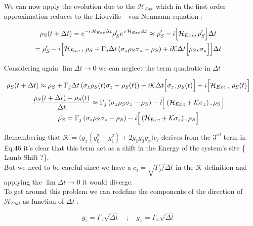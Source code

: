 \documentclass[a4paper,12pt]{article}
\begin{document}
	   We can now apply the evolution due to the $ \mathcal{H}_{Exc} $ which in the first order approximation reduces to the Liouville - von Neumann equation : 
	   
	   \begin{gather}
	   	\rho_S (t + \Delta t) = e^{-i \, \mathcal{H}_{Exc} \Delta t} \rho_S' e^{\, i \, \mathcal{H}_{Exc} \Delta t} \approx \rho_S' - i \Big[\mathcal{H}_{Exc} , \rho_S' \Big] \Delta t \notag \\
	   	= \rho_S' - i \Big[ \mathcal{H}_{Exc} \, , \, \rho_S + \Gamma_{j} \Delta t \left( \sigma_{z} \rho_S \sigma_{z} - \rho_S \right) + i \mathcal{K} \Delta t \Big[ \rho_S , \sigma_{z} \Big] \Big] \Delta t
	   \end{gather} 
	   
	   Considering again $ \lim \Delta t \rightarrow 0 $ we can neglect the term quadratic in $ \Delta t $
	   
	   \begin{gather}
	   	\rho_S (t + \Delta t) \approx \rho_S + \Gamma_{j} \Delta t \left( \sigma_{z} \rho_S (t) \sigma_{z} - \rho_S (t) \right) - i \mathcal{K} \Delta t \Big[ \sigma_{z} , \rho_S (t) \Big] - i \Big[ \mathcal{H}_{Exc} \, , \, \rho_S (t) \Big] \notag \\
	   	\frac{\rho_S (t + \Delta t) - \rho_S (t)}{\Delta t} \approx \Gamma_{j} \left( \sigma_{z} \rho_S \sigma_{z} - \rho_S \right) - i \Big[ \left( \mathcal{H}_{Exc} + \mathcal{K} \sigma_z \right), \rho_S \Big] \notag \\
	   	\dot{\rho_S} = \Gamma_{j} \left( \sigma_{z} \rho_S \sigma_{z} - \rho_S \right) - i \Big[ \left( \mathcal{H}_{Exc} + \mathcal{K} \sigma_z \right), \rho_S \Big]
	   \end{gather}
	   
	   Remembering that $ \mathcal{K} = \Big( g_{z}\left(g_{0}^{2} - g_{1}^{2} \right) + 2 g_{1} g_{0} g_{x} \Big) c_j $ derives from the $ 3^{rd} $ term in Eq.46 it's clear that this term act as a shift in the Energy of the system's site \{ Lamb Shift ?\}. \\
	   But we need to be careful since we have a $ c_j = \sqrt{\Gamma_j / \Delta t} $ in the $ \mathcal{K} $ definition and applying the $ \lim \Delta t \rightarrow 0 $ it would diverge. \\
	   To get around this problem we can redefine the components of the direction of $ \mathcal{H}_{Coll} $ as function of $ \Delta t $ :
	   
	   \begin{equation}
	   	g_z = \Gamma_{z} \sqrt{\Delta t} \quad ; \quad g_x = \Gamma_{x} \sqrt{\Delta t}
	   \end{equation}
	   
\end{document}

